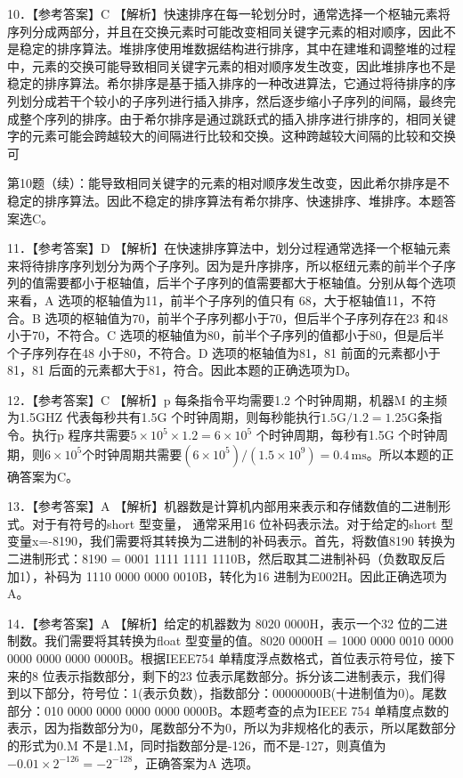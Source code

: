 \documentclass[UTF8,11pt]{ctexart}
\begin{document}
10．【参考答案】C 【解析】快速排序在每一轮划分时，通常选择一个枢轴元素将序列分成两部分，并且在交换元素时可能改变相同关键字元素的相对顺序，因此不是稳定的排序算法。堆排序使用堆数据结构进行排序，其中在建堆和调整堆的过程中，元素的交换可能导致相同关键字元素的相对顺序发生改变，因此堆排序也不是稳定的排序算法。希尔排序是基于插入排序的一种改进算法，它通过将待排序的序列划分成若干个较小的子序列进行插入排序，然后逐步缩小子序列的间隔，最终完成整个序列的排序。由于希尔排序是通过跳跃式的插入排序进行排序的，相同关键字的元素可能会跨越较大的间隔进行比较和交换。这种跨越较大间隔的比较和交换可


第10题（续）：能导致相同关键字的元素的相对顺序发生改变，因此希尔排序是不稳定的排序算法。因此不稳定的排序算法有希尔排序、快速排序、堆排序。本题答案选C。


11．【参考答案】D 【解析】在快速排序算法中，划分过程通常选择一个枢轴元素来将待排序序列划分为两个子序列。因为是升序排序，所以枢纽元素的前半个子序列的值需要都小于枢轴值，后半个子序列的值需要都大于枢轴值。分别从每个选项来看，A 选项的枢轴值为11，前半个子序列的值只有 68，大于枢轴值11，不符合。B 选项的枢轴值为70，前半个子序列都小于70，但后半个子序列存在23 和48 小于70，不符合。C 选项的枢轴值为80，前半个子序列的值都小于80，但是后半个子序列存在48 小于80，不符合。D 选项的枢轴值为81，81 前面的元素都小于81，81 后面的元素都大于81，符合。因此本题的正确选项为D。


12．【参考答案】C 【解析】p 每条指令平均需要1.2 个时钟周期，机器M 的主频为1.5GHZ 代表每秒共有1.5G 个时钟周期，则每秒能执行\(\displaystyle 1.5\mathrm{G}/1.2=1.25\mathrm{G}\)条指令。执行p 程序共需要\(\displaystyle 5\times10^5\times1.2=6\times10^5\) 个时钟周期，每秒有1.5G 个时钟周期，则\(\displaystyle 6\times10^5\)个时钟周期共需要\(\displaystyle (6\times10^5)/(1.5\times10^9)=0.4\,\mathrm{ms}\)。所以本题的正确答案为C。


13．【参考答案】A 【解析】机器数是计算机内部用来表示和存储数值的二进制形式。对于有符号的short 型变量， 通常采用16 位补码表示法。对于给定的short 型变量x=-8190，我们需要将其转换为二进制的补码表示。首先，将数值8190 转换为二进制形式：8190 = 0001 1111 1111 1110B，然后取其二进制补码（负数取反后加1），补码为 1110 0000 0000 0010B，转化为16 进制为E002H。因此正确选项为A。


14．【参考答案】A 【解析】给定的机器数为 8020 0000H，表示一个32 位的二进制数。我们需要将其转换为float 型变量的值。8020 0000H = 1000 0000 0010 0000 0000 0000 0000 0000B。根据IEEE754 单精度浮点数格式，首位表示符号位，接下来的8 位表示指数部分，剩下的23 位表示尾数部分。拆分该二进制表示，我们得到以下部分，符号位：1(表示负数)，指数部分：00000000B(十进制值为0)。尾数部分：010 0000 0000 0000 0000 0000B。本题考查的点为IEEE 754 单精度点数的表示，因为指数部分为0，尾数部分不为0，所以为非规格化的表示，所以尾数部分的形式为0.M 不是1.M，同时指数部分是-126，而不是-127，则真值为 \(\displaystyle -0.01\times2^{-126}=-2^{-128}\)，正确答案为A 选项。
\end{document}
